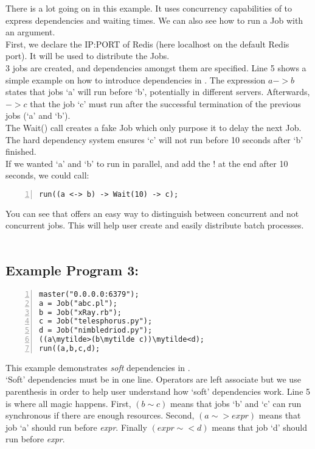 There is a lot going on in this example. It uses concurrency capabilities of \lang{} to express dependencies and
waiting times. We can also see how to run a Job with an argument.\\
First, we declare the IP:PORT of Redis (here localhost on the default Redis port). It will be used to
distribute the Jobs.\\
3 jobs are created, and dependencies amongst them are specified.
Line 5 shows a simple example on how to introduce dependencies in \lang{}.
The expression $a -> b$ states that jobs `a' will run before `b', potentially in different servers. Afterwards,  $-> c$ that the job `c' must run after the successful termination of the previous jobs (`a' and `b').\\
The Wait() call creates a fake Job which only purpose it to delay the next Job. The hard dependency system
ensures `c' will not run before 10 seconds after `b' finished.\\
If we wanted `a' and `b' to run in parallel, and add the ! at the end after 10 seconds, we could call:
\begin{Verbatim}[numbers=left]
run((a <-> b) -> Wait(10) -> c);
\end{Verbatim}

You can see that \lang{} offers an easy way to distinguish between
concurrent and not concurrent jobs. This will help user create and easily distribute batch processes.\\
\\

\subsection*{Example Program 3:}
\begin{Verbatim}[numbers=left,commandchars=\\\{\}]
master("0.0.0.0:6379");
a = Job("abc.pl");
b = Job("xRay.rb");
c = Job("telesphorus.py");
d = Job("nimbledriod.py");
((a\mytilde>(b\mytilde c))\mytilde<d);
run((a,b,c,d);
\end{Verbatim}

This example demonstrates {\em soft} dependencies in \lang{}.\\
`Soft' dependencies must be in one line. Operators
are left associate but we use parenthesis in order to help
user understand how `soft' dependencies work. Line 5 is where all
magic happens. First, $(b\sim c)$ means that jobs `b' and `c' can run 
synchronous if there are enough resources. Second,
$(a\sim>expr)$ means that job `a' should run before \textit{expr}. 
Finally $(expr\sim<d)$ means that job `d' should run before \textit{expr}.\\
\\

